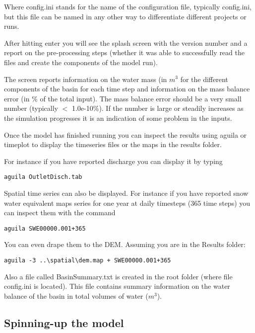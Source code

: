 Where \textsf{config.ini} stands for the name of the configuration file, typically \textsf{config.ini}, but this file can be named in any other way to differentiate different projects or runs. 

After hitting enter you will see the splash screen with the version number and a report on the pre-processing steps (whether it was able to successfully read the files and create the components of the model run). 

The screen reports information on the water mass (in $ m^{3} $ for the different components of the basin for each time step and information on the mass balance error (in \% of the total input). The mass balance error should be a very small number (typically $<$ 1.0e-10\%). If the number is large or steadily increases as the simulation progresses it is an indication of some problem in the inputs. 

Once the model has finished running you can inspect the results using \textsf{aguila} or \textsf{timeplot} to display the timeseries files or the maps in the results folder. 

For instance if you have reported discharge you can display it by typing

\begin{verbatim}
aguila OutletDisch.tab
\end{verbatim}

Spatial time series can also be displayed. For instance if you have reported snow water equivalent maps series for one year at daily timesteps (365 time steps) you can inspect them with the command

\begin{verbatim}
aguila SWE00000.001+365
\end{verbatim}

You can even drape them to the DEM. Assuming you are in the \textsf{Results} folder:

\begin{verbatim}
aguila -3 ..\spatial\dem.map + SWE00000.001+365
\end{verbatim}

Also a file called \textsf{BasinSummary.txt} is created in the root folder (where file \textsf{config.ini} is located). This file contains summary information on the water balance of the basin in total volumes of water ($m^{3}$).
 

\subsection{Spinning-up the model}

